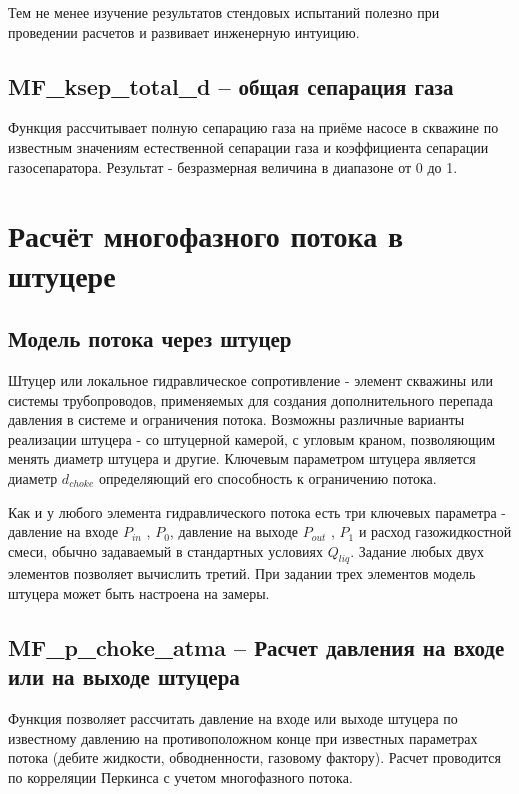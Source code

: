 Тем не менее изучение результатов стендовых испытаний полезно при проведении расчетов и развивает инженерную интуицию. 



\subsection{MF\_ksep\_total\_d – общая сепарация газа}

Функция рассчитывает полную сепарацию газа на приёме насосе в скважине по известным значениям естественной сепарации газа и коэффициента сепарации газосепаратора. Результат - безразмерная величина в диапазоне от 0 до 1. 


\section{Расчёт многофазного потока в штуцере}

\subsection{Модель потока через штуцер}


Штуцер или локальное гидравлическое сопротивление - элемент скважины или системы трубопроводов, применяемых для создания дополнительного перепада давления в системе и ограничения потока. 
Возможны различные варианты реализации штуцера - со штуцерной камерой, с угловым краном, позволяющим менять диаметр штуцера и другие.
Ключевым параметром штуцера является диаметр \(d_{choke} \) определяющий его способность к ограничению потока. 

Как и у любого элемента гидравлического потока есть три ключевых параметра - давление на входе \( P_{in} \) , \( P_0\), давление на выходе \(P_{out}\) , \( P_1\) и расход газожидкостной смеси, обычно задаваемый в стандартных условиях \(Q_{liq} \). Задание любых двух элементов позволяет вычислить третий. При задании трех элементов модель штуцера может быть настроена на замеры.
 

\subsection{MF\_p\_choke\_atma – Расчет давления на входе или на выходе штуцера}
Функция позволяет рассчитать давление на входе или выходе штуцера по известному давлению на противоположном конце при известных параметрах потока (дебите жидкости, обводненности, газовому фактору). Расчет проводится по корреляции Перкинса \cite{Perkins_1993} с учетом многофазного потока.  

